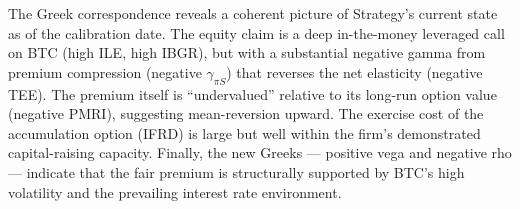 \begin{remark}
\label{rem:unified}
The Greek correspondence reveals a coherent picture of Strategy's current state as of the calibration date. The equity claim is a deep in-the-money leveraged call on BTC (high ILE, high IBGR), but with a substantial negative gamma from premium compression (negative $\gamma_{\pi S}$) that reverses the net elasticity (negative TEE). The premium itself is ``undervalued'' relative to its long-run option value (negative PMRI), suggesting mean-reversion upward. The exercise cost of the accumulation option (IFRD) is large but well within the firm's demonstrated capital-raising capacity. Finally, the new Greeks --- positive vega and negative rho --- indicate that the fair premium is structurally supported by BTC's high volatility and the prevailing interest rate environment.
\end{remark}
